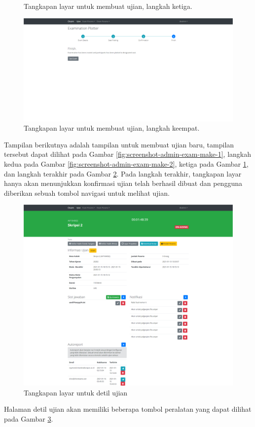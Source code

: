 \begin{figure}
        \caption{Tangkapan layar untuk membuat ujian, langkah ketiga.}
        \label{fig:screenshot-admin-exam-make-3}
    \end{figure}\begin{figure}
        \centering
        \includegraphics[width=0.7\paperwidth]{Gambar/implemented-interface/admin/ujian-make-4.png}
        \caption{Tangkapan layar untuk membuat ujian, langkah keempat.}
        \label{fig:screenshot-admin-exam-make-4}
    \end{figure}
    Tampilan berikutnya adalah tampilan untuk membuat ujian baru, tampilan tersebut dapat dilihat
    pada Gambar \ref{fig:screenshot-admin-exam-make-1}, langkah kedua pada Gambar \ref{fig:screenshot-admin-exam-make-2},
    ketiga pada Gambar \ref{fig:screenshot-admin-exam-make-3}, dan langkah terakhir pada Gambar
    \ref{fig:screenshot-admin-exam-make-4}.
    Pada langkah terakhir, tangkapan layar hanya akan menunjukkan konfirmasi ujian telah berhasil dibuat 
    dan pengguna diberikan sebuah tombol navigasi untuk melihat ujian.
    
    \begin{figure}
        \centering
        \includegraphics[width=0.7\paperwidth]{Gambar/implemented-interface/admin/ujian-detail.png}
        \caption{Tangkapan layar untuk detil ujian}
        \label{fig:screenshot-admin-exam-detail}
    \end{figure}
    Halaman detil ujian akan memiliki beberapa tombol peralatan yang dapat dilihat pada Gambar
    \ref{fig:screenshot-admin-exam-detail}.
    
